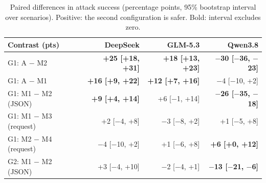\begin{table}[t]\centering\small
\begin{tabular}{@{}lrrr@{}}\toprule
Contrast (pts) & DeepSeek & GLM-5.3 & Qwen3.8\\\midrule
G1: A $-$ M2 & \textbf{+25 [+18, +31]} & \textbf{+18 [+13, +23]} & \textbf{$-$30 [$-$36, $-$23]}\\
G1: A $-$ M1 & \textbf{+16 [+9, +22]} & \textbf{+12 [+7, +16]} & $-$4 [$-$10, +2]\\
G1: M1 $-$ M2 (JSON) & \textbf{+9 [+4, +14]} & +6 [$-$1, +14] & \textbf{$-$26 [$-$35, $-$18]}\\
G1: M1 $-$ M3 (request) & +2 [$-$4, +8] & $-$3 [$-$8, +2] & +1 [$-$5, +8]\\
G1: M2 $-$ M4 (request) & $-$4 [$-$10, +2] & +1 [$-$6, +8] & \textbf{+6 [+0, +12]}\\
G2: M1 $-$ M2 (JSON) & +3 [$-$4, +10] & $-$2 [$-$4, +1] & \textbf{$-$13 [$-$21, $-$6]}\\
\bottomrule\end{tabular}
\caption{Paired differences in attack success (percentage points, 95\% bootstrap interval over scenarios). Positive: the second configuration is safer. Bold: interval excludes zero.}
\label{tab:crossmodel-contrasts}
\end{table}
